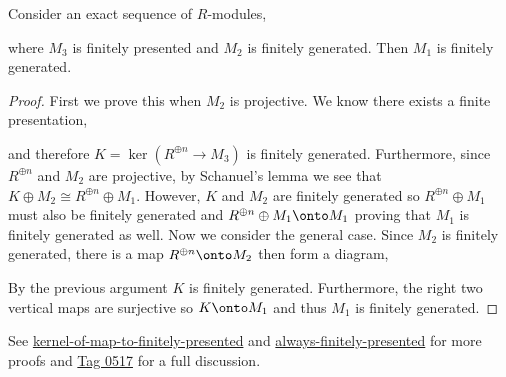 \documentclass[12pt]{article}
\begin{document}
\begin{prop}
Consider an exact sequence of $R$-modules,
\begin{center}
\end{center}
where $M_3$ is finitely presented and $M_2$ is finitely generated. Then $M_1$ is finitely generated.
\end{prop}

\begin{proof}
First we prove this when $M_2$ is projective. We know there exists a finite presentation,
\begin{center}
\end{center} 
and therefore $K = \ker{(R^{\oplus n} \to M_3)}$ is finitely generated. Furthermore, since $R^{\oplus n}$ and $M_2$ are projective, by Schanuel's lemma we see that $K \oplus M_2 \cong R^{\oplus n} \oplus M_1$. However, $K$ and $M_2$ are finitely generated so $R^{\oplus n} \oplus M_1$ must also be finitely generated and $R^{\oplus n} \oplus M_1 \onto M_1$ proving that $M_1$ is finitely generated as well. Now we consider the general case. Since $M_2$ is finitely generated, there is a map $R^{\oplus n} \onto M_2$ then form a diagram,
\begin{center}
\end{center}
By the previous argument $K$ is finitely generated. Furthermore, the right two vertical maps are surjective so $K \onto M_1$ and thus $M_1$ is finitely generated. 
\end{proof}

\begin{rmk}
See \href{https://math.stackexchange.com/questions/1201049/is-the-kernel-of-a-map-to-a-finitely-presented-module-finitely-generated}{kernel-of-map-to-finitely-presented} and \href{https://mathoverflow.net/questions/1788/does-finitely-presented-mean-always-finitely-presented-answered-yes}{always-finitely-presented} for more proofs and \href{https://stacks.math.columbia.edu/tag/0517}{Tag 0517} for a full discussion. 
\end{rmk}
\end{document}
